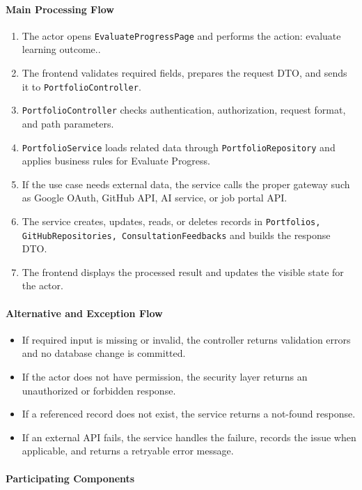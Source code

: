 \paragraph{Main Processing Flow}

\begin{enumerate}
    \item The actor opens \texttt{EvaluateProgressPage} and performs the action: evaluate learning outcome..
    \item The frontend validates required fields, prepares the request DTO, and sends it to \texttt{PortfolioController}.
    \item \texttt{PortfolioController} checks authentication, authorization, request format, and path parameters.
    \item \texttt{PortfolioService} loads related data through \texttt{PortfolioRepository} and applies business rules for Evaluate Progress.
    \item If the use case needs external data, the service calls the proper gateway such as Google OAuth, GitHub API, AI service, or job portal API.
    \item The service creates, updates, reads, or deletes records in \texttt{Portfolios, GitHubRepositories, ConsultationFeedbacks} and builds the response DTO.
    \item The frontend displays the processed result and updates the visible state for the actor.
\end{enumerate}

\paragraph{Alternative and Exception Flow}

\begin{itemize}
    \item If required input is missing or invalid, the controller returns validation errors and no database change is committed.
    \item If the actor does not have permission, the security layer returns an unauthorized or forbidden response.
    \item If a referenced record does not exist, the service returns a not-found response.
    \item If an external API fails, the service handles the failure, records the issue when applicable, and returns a retryable error message.
\end{itemize}

\paragraph{Participating Components}

